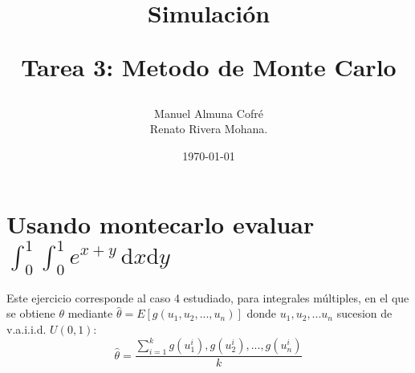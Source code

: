 \documentclass[letter, 10pt]{article}
\begin{document}
\title{Simulaci\'on \\ \begin{Large}Tarea 3: Metodo de Monte Carlo\end{Large}}
\author{Manuel Almuna Cofr\'e \\
Renato Rivera Mohana.}
\date{\today}
\maketitle
\section{Usando montecarlo evaluar $\int_0^1 \int_0^1 \! e^{x+y} \, \mathrm{d} x\mathrm{d} y $}
Este ejercicio corresponde al caso 4 estudiado, para integrales m\'ultiples, en el que se obtiene $\theta$ mediante $\hat{\theta}= E[g(u_1,u_2,...,u_n)]$
donde $u_1, u_2,...u_n$ sucesion de v.a.i.i.d. $U(0,1)$:
$$\hat{\theta}= \frac{\sum_{i=1}^{k} \! g(u_1^i), g(u_2^i),..., g(u_n^i)}{k} $$
\end{document}
